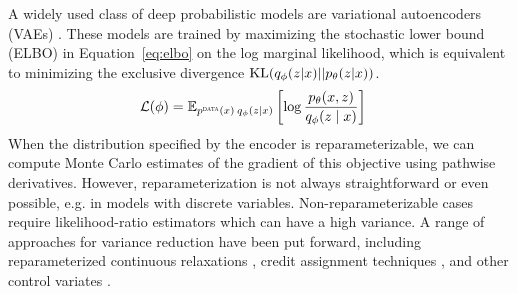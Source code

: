 \documentclass{article}
\theoremstyle{definition}
\begin{document}
A widely used class of deep probabilistic models are variational autoencoders (VAEs) \cite{kingma2013auto-encoding, rezende2014stochastic}.
These models are trained by maximizing the stochastic lower bound (ELBO) in Equation~\ref{eq:elbo} on the log marginal likelihood, which is equivalent to minimizing the exclusive divergence $\mathrm{KL}(q_\phi(z | x) || p_\theta(z | x))$. 
\begin{align}
    \label{eq:elbo}
    \mathcal{L} (\phi)
    &
    = 
    \mathbb{E}_{p^\textsc{data}(x) \: q_\phi(z \mid x)}
    \left[
       \log \frac{p_\theta(x, z)}{q_\phi(z \mid x)}
    \right] 
\end{align}
When the distribution specified by the encoder is reparameterizable, we can compute Monte Carlo estimates of the gradient of this objective using pathwise derivatives. However, reparameterization is not always straightforward or even possible, e.g. in models with discrete variables. Non-reparameterizable cases require likelihood-ratio estimators  \cite{williams1992simple} %
which can have a high variance. A range of approaches for variance reduction have been put forward, including reparameterized continuous relaxations \cite{maddison2017concrete,jang2017categorical}, credit assignment techniques \cite{weber2019credit}, and other control variates \cite{mnih2016variational,tucker2017rebar,grathwohl2018backpropagation}. 
\end{document}
